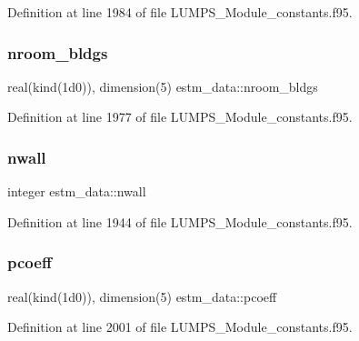 Definition at line 1984 of file L\+U\+M\+P\+S\+\_\+\+Module\+\_\+constants.\+f95.

\mbox{\label{namespaceestm__data_aeae0b58494bd32de61b8f33c59ec8a35}} 
\subsubsection{\texorpdfstring{nroom\+\_\+bldgs}{nroom\_bldgs}}
{\footnotesize\ttfamily real(kind(1d0)), dimension(5) estm\+\_\+data\+::nroom\+\_\+bldgs}



Definition at line 1977 of file L\+U\+M\+P\+S\+\_\+\+Module\+\_\+constants.\+f95.

\mbox{\label{namespaceestm__data_a736fcc4e8ebcaaebce24ee35abc0914e}} 
\subsubsection{\texorpdfstring{nwall}{nwall}}
{\footnotesize\ttfamily integer estm\+\_\+data\+::nwall}



Definition at line 1944 of file L\+U\+M\+P\+S\+\_\+\+Module\+\_\+constants.\+f95.

\mbox{\label{namespaceestm__data_a7f399d89721620a96604b14fbbceb842}} 
\subsubsection{\texorpdfstring{pcoeff}{pcoeff}}
{\footnotesize\ttfamily real(kind(1d0)), dimension(5) estm\+\_\+data\+::pcoeff}



Definition at line 2001 of file L\+U\+M\+P\+S\+\_\+\+Module\+\_\+constants.\+f95.

\mbox{\label{namespaceestm__data_a6e7238f21142ff1e6b7b2482ff279191}} 
